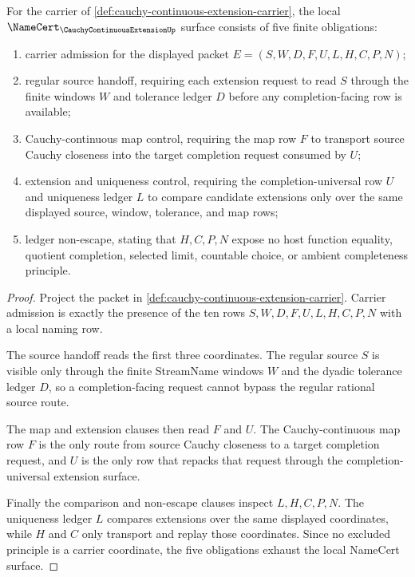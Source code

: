 \begin{theorem}
\label{thm:cauchy-continuous-extension-namecert-obligations}
For the carrier of \autoref{def:cauchy-continuous-extension-carrier}, the local $\NameCert_{\CauchyContinuousExtensionUp}$ surface consists of five finite obligations:
\begin{enumerate}
\item carrier admission for the displayed packet $E=(S,W,D,F,U,L,H,C,P,N)$;
\item regular source handoff, requiring each extension request to read $S$ through the finite windows $W$ and tolerance ledger $D$ before any completion-facing row is available;
\item Cauchy-continuous map control, requiring the map row $F$ to transport source Cauchy closeness into the target completion request consumed by $U$;
\item extension and uniqueness control, requiring the completion-universal row $U$ and uniqueness ledger $L$ to compare candidate extensions only over the same displayed source, window, tolerance, and map rows;
\item ledger non-escape, stating that $H,C,P,N$ expose no host function equality, quotient completion, selected limit, countable choice, or ambient completeness principle.
\end{enumerate}
\end{theorem}
\begin{proof}
Project the packet in \autoref{def:cauchy-continuous-extension-carrier}. Carrier admission is exactly the presence of the ten rows $S,W,D,F,U,L,H,C,P,N$ with a local naming row.

The source handoff reads the first three coordinates. The regular source $S$ is visible only through the finite StreamName windows $W$ and the dyadic tolerance ledger $D$, so a completion-facing request cannot bypass the regular rational source route.

The map and extension clauses then read $F$ and $U$. The Cauchy-continuous map row $F$ is the only route from source Cauchy closeness to a target completion request, and $U$ is the only row that repacks that request through the completion-universal extension surface.

Finally the comparison and non-escape clauses inspect $L,H,C,P,N$. The uniqueness ledger $L$ compares extensions over the same displayed coordinates, while $H$ and $C$ only transport and replay those coordinates. Since no excluded principle is a carrier coordinate, the five obligations exhaust the local NameCert surface.
\end{proof}


